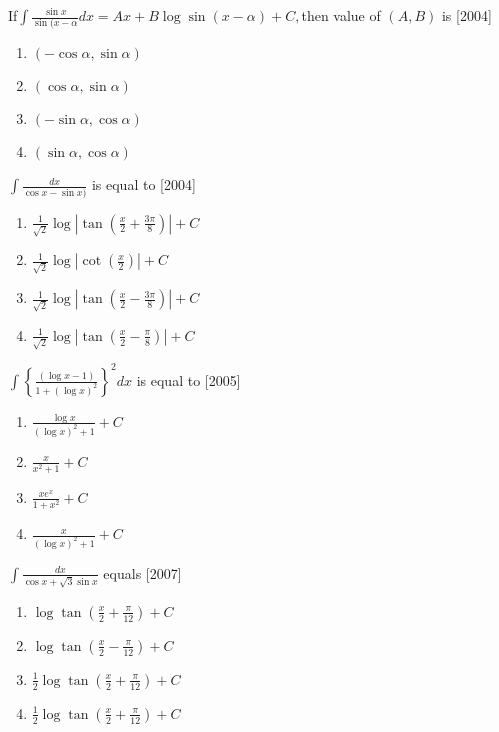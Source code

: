 \iffalse
\title{Assignment}
\author{K.AKSHAY TEJA}
\section{mains}
\fi
\item If$\int$$\frac{\sin x}{\sin (x-\alpha}dx = Ax+B\log \sin (x-\alpha)+C,$then value of $(A,B)$ is    \hfill        [2004]
\begin{enumerate}
       \item { $(-\cos \alpha, \sin \alpha)$ }  
       \item  $(\cos \alpha,\sin \alpha)$
       \item    $(-\sin \alpha,\cos \alpha)$   
       \item  $(\sin \alpha,\cos \alpha)$ 
\end{enumerate}

\item   $\int\frac{dx}{\cos x-\sin x)}$ is equal to             \hfill [2004]
      \begin{enumerate}
\item  $\frac{1}{\sqrt{2}}\log \left|\tan \left(\frac{x}{2}+\frac{3\pi}{8}\right)\right|+C$

\item  $\frac{1}{\sqrt{2}}\log \left|\cot \left(\frac{x}{2}\right)\right|+C$ 

\item  {$\frac{1}{\sqrt{2}}\log \left|\tan \left(\frac{x}{2}-\frac{3\pi}{8}\right)\right|+C$}

\item  {$\frac{1}{\sqrt{2}}\log \left|\tan \left(\frac{x}{2}-\frac{\pi}{8}\right)\right|+C$}
\end{enumerate}
\item  $\int\left\{ \frac{(\log x-1)}{1+(\log x)^2}\right\}^2 dx$ is equal to     \hfill [2005]
 \begin{enumerate} 
\item  $\frac{\log x}{(\log x)^2 +1}+C$         
\item  $\frac{x}{x^2+1}+C$
\item  $\frac{xe^x}{1+x^2}+C$                       
\item  $\frac{x}{(\log x)^2+1}+C$
\end{enumerate}
\item $\int \frac{dx}{\cos x + \sqrt{3} \sin x}$ equals \hfill [2007]
  \begin{enumerate}
\item  $\log \tan \left(\frac{x}{2}+\frac{\pi}{12}\right)+C$
\item  $\log \tan \left(\frac{x}{2}-\frac{\pi}{12}\right)+C$
\item  $\frac{1}{2} \log \tan \left(\frac{x}{2}+\frac{\pi}{12}\right)+C$
\item  $\frac{1}{2} \log \tan \left(\frac{x}{2}+\frac{\pi}{12}\right)+C$
\end{enumerate}



